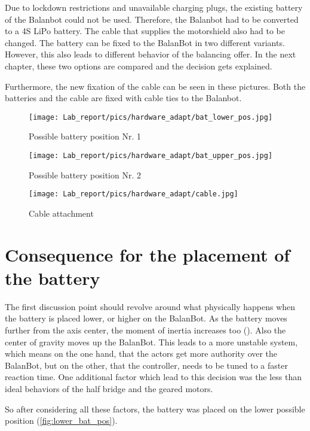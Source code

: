 Due to lockdown restrictions and unavailable charging plugs, the existing battery of the Balanbot could not be used. Therefore, the Balanbot had to be converted to a 4S LiPo battery. The cable that supplies the motorshield also had to be changed. The battery can be fixed to the BalanBot in two different variants. However, this also leads to different behavior of the balancing offer. In the next chapter, these two options are compared and the decision gets explained.

Furthermore, the new fixation of the cable can be seen in these pictures. Both the batteries and the cable are fixed with cable ties to the Balanbot.
\begin{figure}[H]
    \centering
    \texttt{[image: Lab\_report/pics/hardware\_adapt/bat\_lower\_pos.jpg]}
    \caption{Possible battery position Nr. 1}
    \label{fig:lower_bat_pos}
\end{figure}

\begin{figure}[H]
    \centering
    \texttt{[image: Lab\_report/pics/hardware\_adapt/bat\_upper\_pos.jpg]}
    \caption{Possible battery position Nr. 2 }
    \label{fig:upperlower_bat_pos}
\end{figure}

\begin{figure}[H]
    \centering
    \texttt{[image: Lab\_report/pics/hardware\_adapt/cable.jpg]}
    \caption{Cable attachment}
    \label{fig:cable}
\end{figure}

\section{Consequence for the placement of the battery}
The first discussion point should revolve around what physically happens when the battery is placed lower, or higher on the BalanBot. As the battery moves further from the axis center, the moment of inertia increases too (\cite{enwiki:satz_von_steiner}). Also the center of gravity moves up the BalanBot. This leads to a more unstable system, which means on the one hand, that the actors get more authority over the BalanBot, but on the other, that the controller, needs to be tuned to a faster reaction time. One additional factor which lead to this decision was the less than ideal behaviors of the half bridge and the geared motors. 

So after considering all these factors, the battery was placed on the lower possible position (\autoref{fig:lower_bat_pos}).
